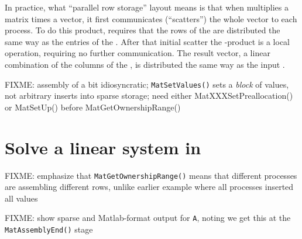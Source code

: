 In practice, what ``parallel row storage'' layout means is that when \PETSc multiplies a matrix times a vector, it first communicates (``scatters'') the whole vector to each process.  To do this product, \PETSc requires that the rows of the \pMat are distributed the same way as the entries of the \pVec.  After that initial scatter the \pMat-\pVec product is a local operation, requiring no further communication.  The result vector, a linear combination of the columns of the \pMat, is distributed the same way as the input \pVec.

FIXME: assembly of \pMat a bit idiosyncratic; \texttt{MatSetValues()} sets a \emph{block} of values, not arbitrary inserts into sparse storage; need either MatXXXSetPreallocation() or MatSetUp() before MatGetOwnershipRange()


\section{Solve a linear system in \PETSc}


FIXME: emphasize that \texttt{MatGetOwnershipRange()} means that different processes are assembling different rows, unlike earlier example where all processes inserted all values



FIXME: show sparse and Matlab-format output for \texttt{A}, noting we get this at the \texttt{MatAssemblyEnd()} stage %


